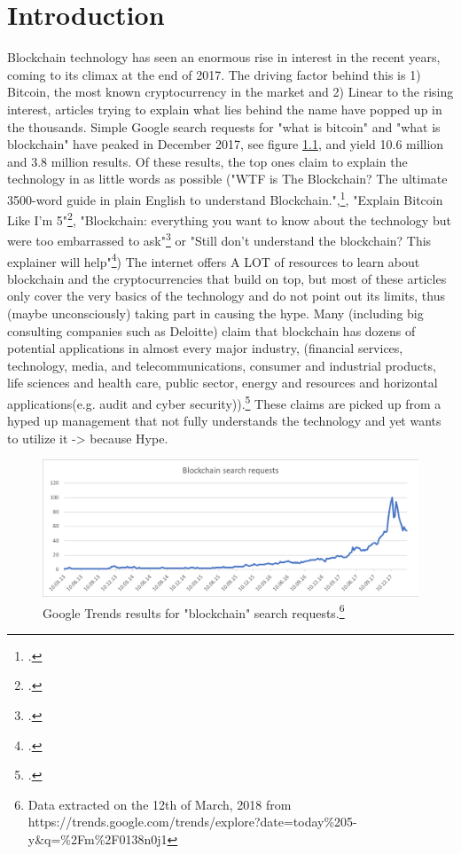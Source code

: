 \chapter{Introduction}
\label{chapter:Intro}

Blockchain technology has seen an enormous rise in interest in the recent years, coming to its climax at the end of 2017. The driving factor behind this is 1) Bitcoin, the most known cryptocurrency in the market and 2) 
Linear to the rising interest, articles trying to explain what lies behind the name have popped up in the thousands. Simple Google search requests for "what is bitcoin" and "what is blockchain" have peaked in December 2017, see figure \ref{fig:SearchRequests}, and yield 10.6 million and 3.8 million results. Of these results, the top ones claim to explain the technology in as little words as possible ("WTF is The Blockchain?
The ultimate 3500-word guide in plain English to understand Blockchain.",\footcite{MamoriaWTFBlockchain2017}, "Explain Bitcoin Like I'm 5"\footcite{CustodioExplainBitcoinFive2013}, "Blockchain: everything you want to know about the technology but were too embarrassed to ask"\footcite{HeathmannBlockchaineverythingyou2018} or "Still don't understand the blockchain? This explainer will help"\footcite{LeighSinodStilldonunderstand2018}) The internet offers A LOT of resources to learn about blockchain and the cryptocurrencies that build on top, but most of these articles only cover the very basics of the technology and do not point out its limits, thus (maybe unconsciously) taking part in causing the hype. Many (including big consulting companies such as Deloitte) claim that blockchain has dozens of potential applications in almost every major industry, (financial services, technology, media, and telecommunications, consumer and industrial products, life sciences and health care, public sector, energy and resources and horizontal applications(e.g. audit and cyber security)).\footcite{SchatskybitcoinBlockchaincoming2015} These claims are picked up from a hyped up management that not fully understands the technology and yet wants to utilize it -> because Hype.

\begin{figure}
    \centering
    \includegraphics[width=\textwidth]{latex-vorlage_v1.5/graphics/BCRQ.png}
    \caption[Google Trends results for "blockchain" search requests.]{Google Trends results for "blockchain" search requests.\footnote{Data extracted on the 12th of March, 2018 from https://trends.google.com/trends/explore?date=today\%205-y\&q=\%2Fm\%2F0138n0j1
}}
    \label{fig:SearchRequests}
\end{figure}

